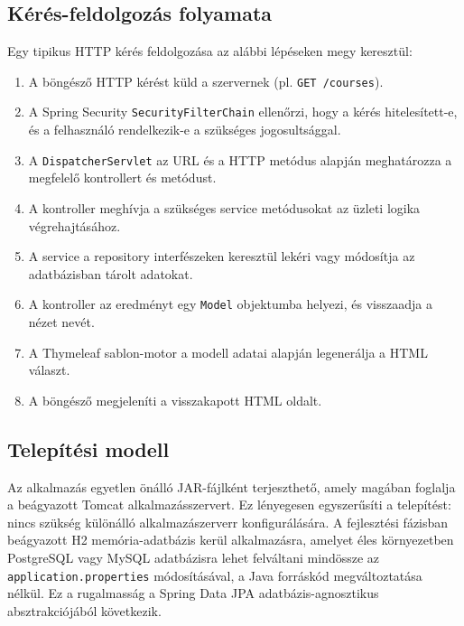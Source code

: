 \subsection{Kérés-feldolgozás folyamata}

Egy tipikus HTTP kérés feldolgozása az alábbi lépéseken megy keresztül:

\begin{enumerate}
    \item A böngésző HTTP kérést küld a szervernek (pl. \texttt{GET /courses}).
    \item A Spring Security \texttt{SecurityFilterChain} ellenőrzi, hogy a kérés hitelesített-e, és a felhasználó rendelkezik-e a szükséges jogosultsággal.
    \item A \texttt{DispatcherServlet} az URL és a HTTP metódus alapján meghatározza a megfelelő kontrollert és metódust.
    \item A kontroller meghívja a szükséges service metódusokat az üzleti logika végrehajtásához.
    \item A service a repository interfészeken keresztül lekéri vagy módosítja az adatbázisban tárolt adatokat.
    \item A kontroller az eredményt egy \texttt{Model} objektumba helyezi, és visszaadja a nézet nevét.
    \item A Thymeleaf sablon-motor a modell adatai alapján legenerálja a HTML választ.
    \item A böngésző megjeleníti a visszakapott HTML oldalt.
\end{enumerate}

\subsection{Telepítési modell}

Az alkalmazás egyetlen önálló JAR-fájlként terjeszthető, amely magában foglalja a beágyazott Tomcat alkalmazásszervert. Ez lényegesen egyszerűsíti a telepítést: nincs szükség különálló alkalmazászerverr konfigurálására. A fejlesztési fázisban beágyazott H2 memória-adatbázis kerül alkalmazásra, amelyet éles környezetben PostgreSQL vagy MySQL adatbázisra lehet felváltani mindössze az \texttt{application.properties} módosításával, a Java forráskód megváltoztatása nélkül. Ez a rugalmasság a Spring Data JPA adatbázis-agnosztikus absztrakciójából következik.

